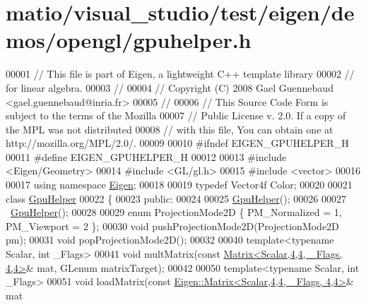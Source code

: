 \hypertarget{matio_2visual__studio_2test_2eigen_2demos_2opengl_2gpuhelper_8h_source}{}\section{matio/visual\+\_\+studio/test/eigen/demos/opengl/gpuhelper.h}
\label{matio_2visual__studio_2test_2eigen_2demos_2opengl_2gpuhelper_8h_source}

\begin{DoxyCode}
00001 \textcolor{comment}{// This file is part of Eigen, a lightweight C++ template library}
00002 \textcolor{comment}{// for linear algebra.}
00003 \textcolor{comment}{//}
00004 \textcolor{comment}{// Copyright (C) 2008 Gael Guennebaud <gael.guennebaud@inria.fr>}
00005 \textcolor{comment}{//}
00006 \textcolor{comment}{// This Source Code Form is subject to the terms of the Mozilla}
00007 \textcolor{comment}{// Public License v. 2.0. If a copy of the MPL was not distributed}
00008 \textcolor{comment}{// with this file, You can obtain one at http://mozilla.org/MPL/2.0/.}
00009 
00010 \textcolor{preprocessor}{#ifndef EIGEN\_GPUHELPER\_H}
00011 \textcolor{preprocessor}{#define EIGEN\_GPUHELPER\_H}
00012 
00013 \textcolor{preprocessor}{#include <Eigen/Geometry>}
00014 \textcolor{preprocessor}{#include <GL/gl.h>}
00015 \textcolor{preprocessor}{#include <vector>}
00016 
00017 \textcolor{keyword}{using namespace }\hyperlink{namespace_eigen}{Eigen};
00018 
00019 \textcolor{keyword}{typedef} Vector4f Color;
00020 
00021 \textcolor{keyword}{class }\hyperlink{class_gpu_helper}{GpuHelper}
00022 \{
00023   \textcolor{keyword}{public}:
00024 
00025     \hyperlink{class_gpu_helper}{GpuHelper}();
00026 
00027     ~\hyperlink{class_gpu_helper}{GpuHelper}();
00028 
00029     \textcolor{keyword}{enum} ProjectionMode2D \{ PM\_Normalized = 1, PM\_Viewport = 2 \};
00030     \textcolor{keywordtype}{void} pushProjectionMode2D(ProjectionMode2D pm);
00031     \textcolor{keywordtype}{void} popProjectionMode2D();
00032 
00040     \textcolor{keyword}{template}<\textcolor{keyword}{typename} Scalar, \textcolor{keywordtype}{int} \_Flags>
00041     \textcolor{keywordtype}{void} multMatrix(\textcolor{keyword}{const} \hyperlink{group___core___module_class_eigen_1_1_matrix}{Matrix<Scalar,4,4, \_Flags, 4,4>}& mat, GLenum 
      matrixTarget);
00042 
00050     \textcolor{keyword}{template}<\textcolor{keyword}{typename} Scalar, \textcolor{keywordtype}{int} \_Flags>
00051     \textcolor{keywordtype}{void} loadMatrix(\textcolor{keyword}{const} \hyperlink{group___core___module_class_eigen_1_1_matrix}{Eigen::Matrix<Scalar,4,4, \_Flags, 4,4>}& mat

\end{DoxyCode}
